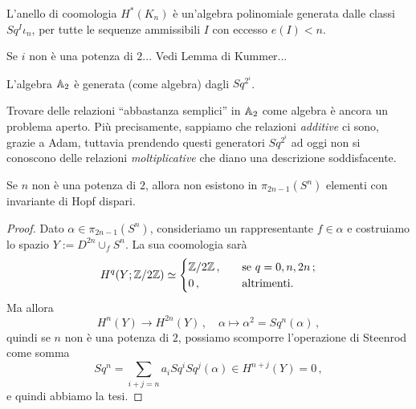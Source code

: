\begin{thm}[Serre]
	L'anello di coomologia $H^{*}(K_{n})$ è un'algebra polinomiale generata dalle classi
	$Sq^{I}\iota_{n}$, per tutte le sequenze ammissibili $I$ con eccesso $e(I) < n$.
\end{thm}

\begin{thm}
	Se $i$ non è una potenza di $2$...
	Vedi Lemma di Kummer...
\end{thm}

\begin{cor}
	L'algebra $\AA_{2}$ è generata (come algebra) dagli $Sq^{2^{i}}$.
\end{cor}

\begin{oss}
	Trovare delle relazioni ``abbastanza semplici'' in $\AA_{2}$
	come algebra è ancora un problema aperto. Più precisamente,
	sappiamo che relazioni \emph{additive} ci sono, grazie a Adam,
	tuttavia prendendo questi generatori $Sq^{2^{i}}$ ad oggi
	non si conoscono delle relazioni  \emph{moltiplicative}
	che diano una descrizione soddisfacente.
\end{oss}

\begin{thm}
	Se $n$ non è  una potenza di $2$, allora non esistono in $\pi_{2n-1}(S^{n})$
	elementi con invariante di Hopf dispari.
	\begin{proof}
		Dato $\alpha \in \pi_{2n-1}(S^{n})$, consideriamo un rappresentante $f \in \alpha$
		e costruiamo lo spazio $Y := D^{2n} \cup_{f} S^{n}$.
		La sua coomologia sarà
		\begin{equation*}
			H^{q}(Y;\Z/2\Z) \simeq \begin{cases}
				\Z/2\Z\,, \quad &\text{se } q = 0, n, 2n\,; \\
				0\,, \quad &\text{altrimenti}.
			\end{cases}
		\end{equation*}
		Ma allora
		\begin{equation*}
			H^{n}(Y) \longrightarrow H^{2n}(Y)\,, \quad
			\alpha \longmapsto \alpha^{2} = Sq^{n}(\alpha)\,,
		\end{equation*}
		quindi se $n$ non è una potenza di $2$, possiamo scomporre
		l'operazione di Steenrod come somma
		\begin{equation*}
			Sq^{n}= \sum_{i+j=n} a_{i} Sq^{i}Sq^{j}(\alpha) \in H^{n+j}(Y) = 0\,,
		\end{equation*}
		e quindi abbiamo la tesi.
	\end{proof}
\end{thm}